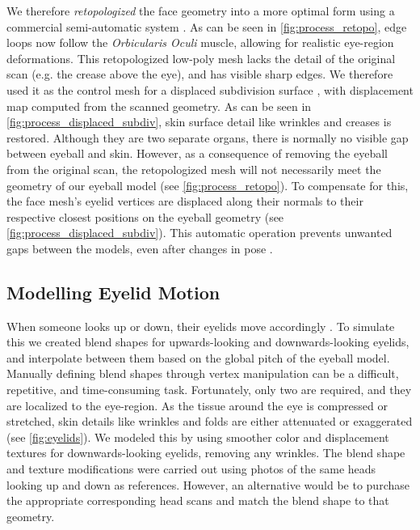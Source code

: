 
We therefore \emph{retopologized} the face geometry into a more optimal form using a commercial semi-automatic system \cite{ZRemesher}.
As can be seen in \autoref{fig:process_retopo}, edge loops now follow the \emph{Orbicularis Oculi} muscle, allowing for realistic eye-region deformations.
This retopologized low-poly mesh lacks the detail of the original scan (e.g. the crease above the eye), and has visible sharp edges.
We therefore used it as the control mesh for a displaced subdivision surface \cite{lee2000displaced}, with displacement map computed from the scanned geometry.
As can be seen in \autoref{fig:process_displaced_subdiv}, skin surface detail like wrinkles and creases is restored.
Although they are two separate organs, there is normally no visible gap between eyeball and skin.
However, as a consequence of removing the eyeball from the original scan, the retopologized mesh will not necessarily meet the geometry of our eyeball model (see \autoref{fig:process_retopo}).
To compensate for this, the face mesh's eyelid vertices are displaced along their normals to their respective closest positions on the eyeball geometry (see \autoref{fig:process_displaced_subdiv}).
This automatic operation prevents unwanted gaps between the models, even after changes in pose \cite{Shrinkwrap}.

\subsection{Modelling Eyelid Motion}

When someone looks up or down, their eyelids move accordingly \cite{liversedge2011oxford}.
To simulate this we created blend shapes for upwards-looking and downwards-looking eyelids, and interpolate between them based on the global pitch of the eyeball model.
Manually defining blend shapes through vertex manipulation can be a difficult, repetitive, and time-consuming task. Fortunately, only two are required, and they are localized to the eye-region.
As the tissue around the eye is compressed or stretched, skin details like wrinkles and folds are either attenuated or exaggerated (see \autoref{fig:eyelids}).
We modeled this by using smoother color and displacement textures for downwards-looking eyelids, removing any wrinkles.
The blend shape and texture modifications were carried out using photos of the same heads looking up and down as references.
However, an alternative would be to purchase the appropriate corresponding head scans and match the blend shape to that geometry.

